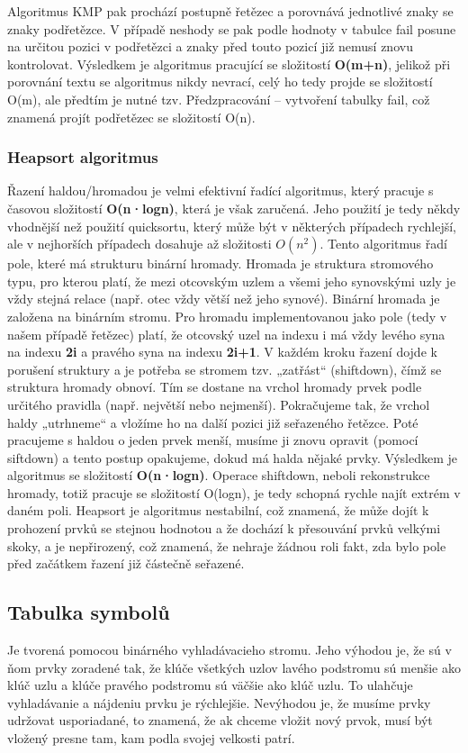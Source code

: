 \documentclass[12pt, a4paper]{article}
\begin{document}
				Algoritmus KMP pak prochází postupně řetězec a porovnává jednotlivé znaky se znaky podřetězce. V případě neshody se pak podle hodnoty v tabulce fail posune na určitou pozici v podřetězci a znaky před touto pozicí již nemusí znovu kontrolovat.
				Výsledkem je algoritmus pracující se složitostí \textbf{O(m+n)}, jelikož při porovnání textu se algoritmus nikdy nevrací, celý ho tedy projde se složitostí O(m), ale předtím je nutné tzv. Předzpracování – vytvoření tabulky fail, což znamená projít podřetězec se složitostí O(n).

			\subsubsection{Heapsort algoritmus}
				Řazení haldou/hromadou je velmi efektivní řadící algoritmus, který pracuje s časovou složitostí \textbf{O(n·logn)}, která je však zaručená. Jeho použití je tedy někdy vhodnější než použití quicksortu, který může být v některých případech rychlejší, ale v nejhorších případech dosahuje až složitosti \(O(n^2)\).
				Tento algoritmus řadí pole, které má strukturu binární hromady. Hromada je struktura stromového typu, pro kterou platí, že mezi otcovským uzlem a všemi jeho synovskými uzly je vždy stejná relace (např. otec vždy větší než jeho synové). Binární hromada je založena na binárním stromu.
				Pro hromadu implementovanou jako pole (tedy v našem případě řetězec) platí, že otcovský uzel na indexu i má vždy levého syna na indexu \textbf{2i} a pravého syna na indexu \textbf{2i+1}.
				V každém kroku řazení dojde k porušení struktury a je potřeba se stromem tzv. „zatřást“ (shiftdown), čímž se struktura hromady obnoví.
				Tím se dostane na vrchol hromady prvek podle určitého pravidla (např. největší nebo nejmenší). Pokračujeme tak, že vrchol haldy „utrhneme“ a vložíme ho na další pozici již seřazeného řetězce. Poté pracujeme s haldou o jeden prvek menší, musíme ji znovu opravit (pomocí siftdown) a tento postup opakujeme, dokud má halda nějaké prvky.
				Výsledkem je algoritmus se složitostí \textbf{O(n·logn)}. Operace shiftdown, neboli rekonstrukce hromady, totiž pracuje se složitostí O(logn), je tedy schopná rychle najít extrém v daném poli. Heapsort je algoritmus nestabilní, což znamená, že může dojít k prohození prvků se stejnou hodnotou a že dochází k přesouvání prvků velkými skoky, a je nepřirozený, což znamená, že nehraje žádnou roli fakt, zda bylo pole před začátkem řazení již částečně seřazené.

			\subsection{Tabulka symbolů}
				Je tvorená pomocou binárného vyhladávacieho stromu. Jeho výhodou je, že sú v ňom prvky zoradené tak, že klúče všetkých uzlov lavého podstromu
				sú menšie ako klúč uzlu a klúče pravého podstromu sú väčšie ako klúč uzlu. To ulahčuje vyhladávanie a nájdeniu prvku je rýchlejšie.
				Nevýhodou je, že musíme prvky udržovat usporiadané, to znamená, že ak chceme vložit nový prvok, musí být vložený presne tam, kam podla
				svojej velkosti patrí.
\end{document}
